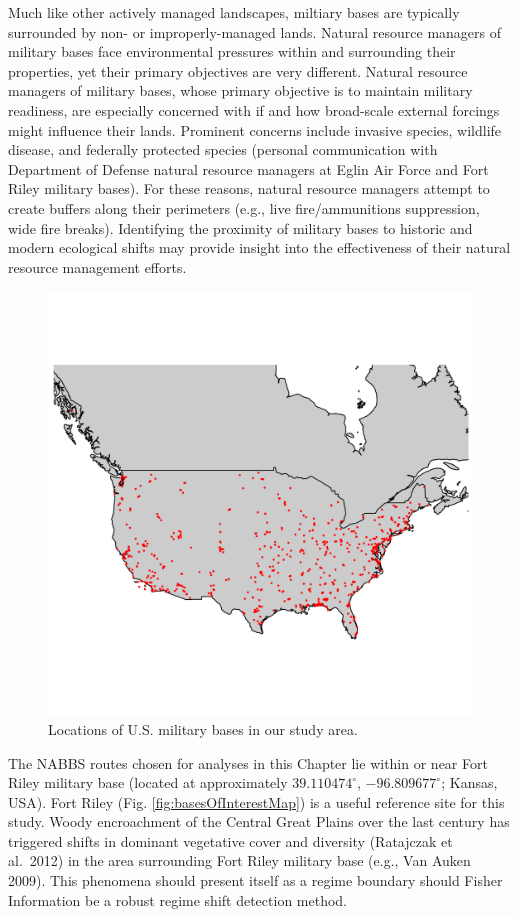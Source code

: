 \documentclass[12pt,twoside,openany]{reedthesis}
\begin{document}
Much like other actively managed landscapes, miltiary bases are typically surrounded by non- or improperly-managed lands. Natural resource managers of military bases face environmental pressures within and surrounding their properties, yet their primary objectives are very different. Natural resource managers of military bases, whose primary objective is to maintain military readiness, are especially concerned with if and how broad-scale external forcings might influence their lands. Prominent concerns include invasive species, wildlife disease, and federally protected species (personal communication with Department of Defense natural resource managers at Eglin Air Force and Fort Riley military bases). For these reasons, natural resource managers attempt to create buffers along their perimeters (e.g., live fire/ammunitions suppression, wide fire breaks). Identifying the proximity of military bases to historic and modern ecological shifts may provide insight into the effectiveness of their natural resource management efforts.
\begin{figure}

{\centering \includegraphics[width=0.85\linewidth]{./chapterFiles/fisherSpatial/figures/figsCalledInDiss/milBases} 

}

\caption{Locations of U.S. military bases in our study area.}\label{fig:milBases}
\end{figure}
The NABBS routes chosen for analyses in this Chapter lie within or near Fort Riley military base (located at approximately \(39.110474^{\circ}\), \(-96.809677^{\circ}\); Kansas, USA). Fort Riley (Fig. \ref{fig:basesOfInterestMap}) is a useful reference site for this study. Woody encroachment of the Central Great Plains over the last century has triggered shifts in dominant vegetative cover and diversity (Ratajczak et al.~2012) in the area surrounding Fort Riley military base (e.g., Van Auken 2009). This phenomena should present itself as a regime boundary should Fisher Information be a robust regime shift detection method.
\end{document}

